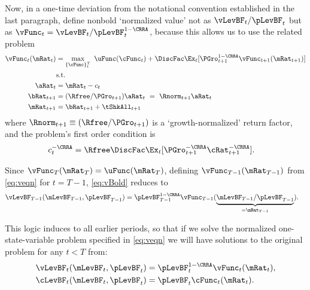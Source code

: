 \documentclass[./BufferStockTheory.tex]{subfiles}
\begin{document}
\hypertarget{The-Related-Problem}{}
Now, in a one-time deviation from the notational convention established in the last paragraph, define nonbold `normalized value' not as $\vLevBF_{t}/\pLevBF_{t}$ but as $\vFunc_{t} = \vLevBF_{t}/\pLevBF_{t}^{1-\CRRA}$, because this allows us to use the related problem 
\begin{equation}\begin{gathered}\begin{aligned}
\vFunc_{t}(\mRat_{t})  & = \max_{\{\cFunc\}_{t}^{T}}~  \uFunc(\cFunc_{t}) +\DiscFac \Ex_{t}[\PGro_{t+1}^{1-\CRRA}\vFunc_{t+1}({\mRat}_{t+1})] \notag \\
& \mbox{s.t.}  \label{eq:veqn} 
 \\ {\aRat}_{t}  & = \mRat_{t}-c_{t}  \notag
 \\ {\bRat}_{t+1}  & = (\Rfree/\PGro_{t+1})\aRat_{t}  ~ = ~ \Rnorm_{t+1}\aRat_{t}  \notag
\\ \mRat_{t+1}  & = \bRat_{t+1}+\tShkAll_{t+1}  \notag %
\end{aligned}\end{gathered}\end{equation}
where $\Rnorm_{t+1}\equiv (\Rfree/\PGro_{t+1})$ is a `growth-normalized' return factor, and the problem's first order condition is
\begin{equation}\begin{gathered}\begin{aligned}
c_{t}^{-\CRRA}  & = \Rfree \DiscFac \Ex_{t}[ {\PGro}_{t+1}^{-\CRRA} {\cRat}
_{t+1}^{-\CRRA}].  \label{eq:scaledeuler}
\end{aligned}\end{gathered}\end{equation}

Since $\vFunc_{T}(\mRat_{T}) = \uFunc(\mRat_{T})$, defining $\vFunc_{T-1}(\mRat_{T-1})$ from \eqref{eq:veqn} for $t=T-1$, \eqref{eq:vBold} reduces to
\begin{align*}
\vLevBF_{T-1}(\mLevBF_{T-1},\pLevBF_{T-1})  & = \pLevBF_{T-1}^{1-\CRRA} \vFunc_{T-1}(\underbrace{\mLevBF_{T-1}/\pLevBF_{T-1}}_{=\mRat_{T-1}}).
\end{align*}

This logic induces to all earlier periods, so that if we solve the
normalized one-state-variable problem specified in \eqref{eq:veqn} we
will have solutions to the original problem for any $t<T$
from:
\begin{align*}
   \vLevBF_{t}(\mLevBF_{t},\pLevBF_{t})  & = \pLevBF_{t}^{1-\CRRA}\vFunc_{t}(\mRat_{t}),
\\ \cLevBF_{t}(\mLevBF_{t},\pLevBF_{t})  & = \pLevBF_{t}\cFunc_{t}(\mRat_{t}).
\end{align*}
\end{document}

